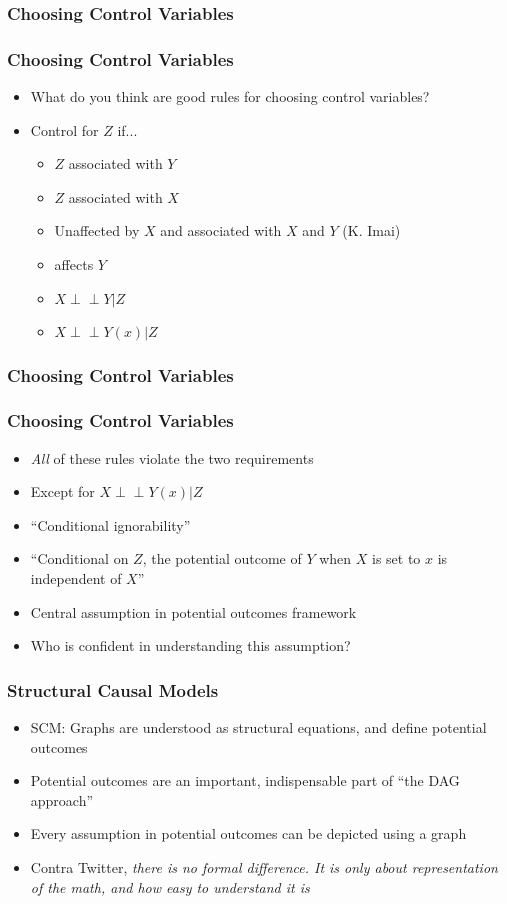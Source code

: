 \documentclass{beamer}
\newcommand{\indep}{\mbox{$\perp\!\!\!\perp$}}
\begin{document}
\frametitle{Choosing Control Variables}
\begin{frame}
\frametitle{Choosing Control Variables}
\begin{itemize}
	\item<1-> What do you think are good rules for choosing control variables?
	\item<2-> Control for $Z$ if...
	\begin{itemize}
		\item<3-> $Z$ associated with $Y$
		\item<4-> $Z$ associated with $X$
		\item<5-> Unaffected by $X$ and associated with $X$ and $Y$ (K. Imai)
		\item<6-> affects $Y$
		\item<7-> $X \indep Y|Z$
		\item<8-> $X \indep Y(x)|Z$ 
	\end{itemize}
\end{itemize}
\end{frame}

\frametitle{Choosing Control Variables}
\begin{frame}
\frametitle{Choosing Control Variables}
\begin{itemize}
	\item<1-> \textit{All} of these rules violate the two requirements 
	\item<2-> Except for $X \indep Y(x)|Z$
	\item<3-> ``Conditional ignorability''
	\item<4-> ``Conditional on $Z$, the potential outcome of $Y$ when $X$ is set to $x$ is independent of $X$''
	\item<5-> Central assumption in potential outcomes framework
	\item<6-> Who is confident in understanding this assumption? 
\end{itemize}
\end{frame}

\begin{frame}[t]
\frametitle{Structural Causal Models}

\begin{itemize}
	\item<1-> SCM: Graphs are understood as structural equations, and define potential outcomes
\item<1-> Potential outcomes are an important, indispensable part of ``the DAG approach''
\item<1-> Every assumption in potential outcomes can be depicted using a graph
\item<2-> Contra Twitter, \textit{there is no formal difference. It is only about representation of the math, and how easy to understand it is}
\end{itemize}
\end{frame}
\end{document}
